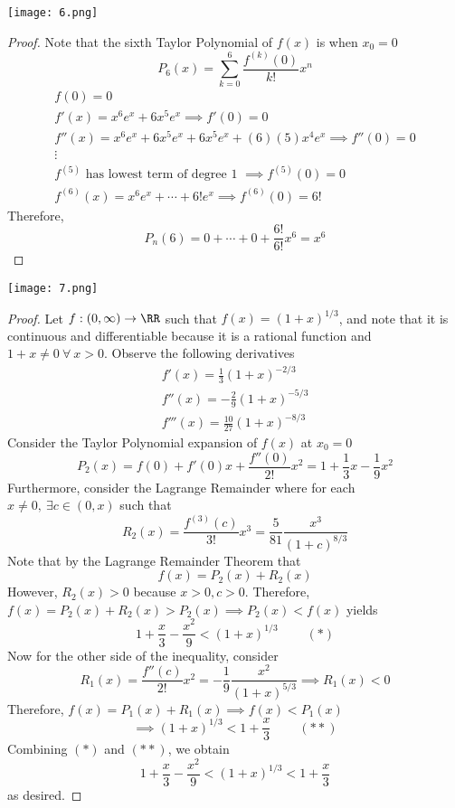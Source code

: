 \documentclass[12pt]{scrartcl}
\begin{document}
\texttt{[image: 6.png]}
\begin{proof}
  Note that the sixth Taylor Polynomial of $f(x)$ is when $x_0 = 0$
  \[P_6(x) = \sum_{k=0}^6 \frac{f^{(k)}(0)}{k!}x^n \]
  \begin{align*}
    f(0) = 0 \\
    f'(x) = x^6e^x + 6x^5 e^x \implies f'(0) = 0\\
    f''(x) = x^6e^x + 6x^5e^x + 6x^5e^x + (6)(5)x^4 e^x \implies f''(0) = 0\\
    \vdots \\
    f^{(5)} \text{ has lowest term of degree 1 } \implies f^{(5)}(0) = 0\\
    f^{(6)}(x) = x^6e^x + \cdots + 6!e^x \implies f^{(6)}(0) = 6!
  \end{align*}
  Therefore, 
  \[P_n(6) = 0 + \cdots + 0 + \frac{6!}{6!}x^6 = x^6\]
\end{proof}
\newpage 

\texttt{[image: 7.png]}
\begin{proof}
  Let $f: (0, \infty) \to \RR$ such that $f(x) = (1 + x)^{1/3}$, and note that it is continuous and differentiable 
  because it is a rational function and $1 + x \neq 0 \ \forall \ x > 0$. Observe the following derivatives 
  \begin{align*}
    f'(x) = \frac{1}{3}(1 + x)^{-2/3} \\
    f''(x) = -\frac{2}{9}(1 + x)^{-5/3}\\ 
    f'''(x) = \frac{10}{27}(1 + x)^{-8/3}
  \end{align*}
  Consider the Taylor Polynomial expansion of $f(x)$ at $x_0 = 0$ 
  \[P_2(x) = f(0) + f'(0)x + \frac{f''(0)}{2!}x^2 = 1 + \frac{1}{3}x - \frac{1}{9}x^2\]
  Furthermore, consider the Lagrange Remainder where for each $x \neq 0, \ \exists c \in (0, x)$ such that  
  \[R_2(x) = \frac{f^{(3)}(c)}{3!}x^3 = \frac{5}{81}\frac{x^3}{(1+c)^{8/3}}\]
  Note that by the Lagrange Remainder Theorem that 
  \[f(x) = P_2(x) + R_2(x)\]
  However, $R_2(x) > 0$ because $x > 0, c > 0$. Therefore, $f(x) = P_2(x) + R_2(x) > P_2(x) \implies P_2(x) < f(x)$
  yields 
  \[1 + \frac{x}{3} - \frac{x^2}{9} < (1 + x)^{1/3} \ \ \ \ \ \ \ \ \ \ (*)\]
  Now for the other side of the inequality, consider
  \[R_1(x) = \frac{f''(c)}{2!}x^2 = -\frac{1}{9}\frac{x^2}{(1+x)^{5/3}} \implies R_1(x) < 0\]
  Therefore, $f(x) = P_1(x) + R_1(x) \implies f(x) < P_1(x)$
  \[ \implies (1 + x)^{1/3} < 1 + \frac{x}{3} \ \ \ \ \ \ \ \ \ \ (**)\]
  Combining $(*)$ and $(**)$, we obtain 
  \[1 + \frac{x}{3} - \frac{x^2}{9} < (1 + x)^{1/3} < 1 + \frac{x}{3}\]
  as desired.
\end{proof}
\end{document}
